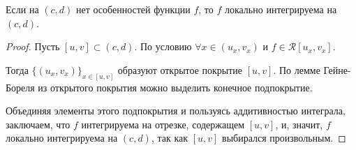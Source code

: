 \begin{note}
    Если на $(c, d)$ нет особенностей функции $f$, то $f$ локально интегрируема на $(c, d)$.

    \begin{proof}
        Пусть $[u, v] \subset (c, d)$. По условию $\forall x \in (u_x, v_x)$ и $f \in \mathcal{R}[u_x, v_x]$.

        Тогда $\{(u_x, v_x)\}_{x \in [u, v]}$ образуют открытое покрытие $[u, v]$. По лемме Гейне-Бореля из открытого покрытия можно выделить конечное подпокрытие.

        Объединяя элементы этого подпокрытия и пользуясь аддитивностью интеграла, заключаем, что $f$ интегрируема на отрезке, содержащем $[u, v]$, и, значит, $f$ локально интегрируема на $(c, d)$, так как $[u, v]$ выбирался произвольным.
    \end{proof}
\end{note}